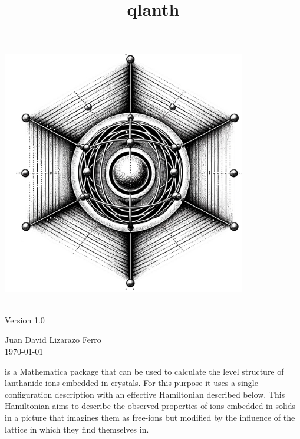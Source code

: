 \documentclass{article}
\begin{document}
\begin{titlepage} %
    \centering
    \vspace*{5cm} %
    
    \includegraphics[width=0.8\textwidth]{ion_in_lattice.jpg} %
    \vspace*{1cm} %
    
    {\Large\qlanth}\\
    \vspace*{0.5cm}
    {\large Version 1.0}\\
    \vspace*{2cm}
    
    {\large Juan David Lizarazo Ferro}\\
    \vspace*{0.5cm}
    {\large \today}\\ %
    
    \vfill %
\end{titlepage}

\title{qlanth}
\author{}
\date{}
\maketitle

\qlanth is a Mathematica package that can be used to calculate the level structure of lanthanide ions embedded in crystals. For this purpose it uses a single configuration description with an effective Hamiltonian described below. This Hamiltonian aims to describe the observed properties of ions embedded in solids in a picture that imagines them as free-ions but modified by the influence of the lattice in which they find themselves in.
\end{document}
